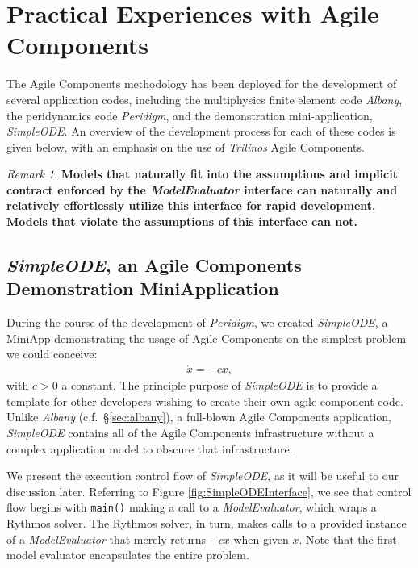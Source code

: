 \documentclass[10pt]{article}
\theoremstyle{plain}
\theoremstyle{definition}
\theoremstyle{remark}
\newtheorem{rem}{Remark}[section]
\numberwithin{equation}{section}
\begin{document}
\section{Practical Experiences with Agile Components}

The Agile Components methodology has been deployed for the development of several application codes, including the multiphysics finite element code \emph{Albany}, the peridynamics code \emph{Peridigm}, and the demonstration mini-application, \emph{SimpleODE}.  An overview of the development process for each of these codes is given below, with an emphasis on the use of \emph{Trilinos} Agile Components.

\begin{rem}
\textbf{Models that naturally fit into the assumptions and implicit contract enforced by the \emph{ModelEvaluator} interface can naturally and relatively effortlessly utilize this interface for rapid development. Models that violate the assumptions of this interface can not.}
\end{rem}

\subsection{\emph{SimpleODE}, an Agile Components Demonstration MiniApplication} \label{sec:simpleode}

During the course of the development of \emph{Peridigm}, we created \emph{SimpleODE}, a MiniApp demonstrating the usage of Agile Components on the simplest problem we could conceive:
\begin{align}
  \dot{x} = -c x,
\end{align}
with $c>0$ a constant. The principle purpose of \emph{SimpleODE} is to provide a template for other developers wishing to create their own agile component code. Unlike \emph{Albany} (c.f.~\S\ref{sec:albany}), a full-blown Agile Components application, \emph{SimpleODE} contains all of the Agile Components infrastructure without a complex application model to obscure that infrastructure.

We present the execution control flow of \emph{SimpleODE}, as it will be useful to our discussion later. Referring to Figure \ref{fig:SimpleODEInterface}, we see that control flow begins with \verb"main()" making a call to a \emph{ModelEvaluator}, which wraps a Rythmos solver. The Rythmos solver, in turn, makes calls to a provided instance of a \emph{ModelEvaluator} that merely returns $-cx$ when given $x$. Note that the first model evaluator encapsulates the entire problem.
\end{document}
